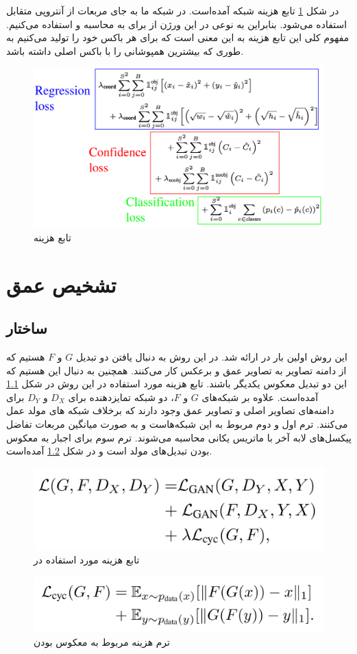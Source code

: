 \documentclass[12pt,a4paper]{report}
\begin{document}
در شکل \ref{yolo4} تابع هزینه شبکه  آمده‌است.
در شبکه ما به جای مربعات از آنتروپی متقابل استفاده می‌شود.
بنابراین به نوعی در این ورژن از  برای به محاسبه  و  استفاده می‌کنیم.
مفهوم کلی این تابع هزینه به این معنی است که برای هر  باکس خود را تولید می‌کنیم به طوری که بیشترین همپوشانی را با باکس اصلی داشته باشد.
\begin{figure}
  \centering
  \includegraphics[width=.8\textwidth]{Images//yolo4.png}
  \caption{تابع هزینه }\label{yolo4}
\end{figure}


\chapter{تشخیص عمق}

\section{ساختار }
این روش اولین بار در \cite{zhu2020unpaired} ارائه شد.
در این روش به دنبال یافتن دو تبدیل $G$ و $F$
هستیم که از دامنه تصاویر  به تصاویر عمق
و برعکس کار می‌کنند. همچنین به دنبال این هستیم که این دو تبدیل معکوس یکدیگر باشند.
تابع هزینه مورد استفاده در این روش در شکل \ref{cg_loss} آمده‌است.
علاوه بر شبکه‌های $G$ و $F$،
دو شبکه تمایزدهنده برای $D_X$ و $D_Y$
برای دامنه‌های تصاویر اصلی و تصاویر عمق وجود دارند که برخلاف شبکه های مولد عمل می‌کنند.
ترم اول و دوم مربوط به این شبکه‌هاست و به صورت میانگین مربعات تفاضل پیکسل‌های لابه
آخر با ماتریس یکانی محاسبه می‌شوند.
ترم سوم برای اجبار به معکوس بودن تبدیل‌های مولد است و در شکل \ref{cg_cycle} آمده‌است.
\begin{figure}[h]
  \centering
  \includegraphics[width=.5\textwidth]{Images//cg1.png}
  \caption{تابع هزینه مورد استفاده در }\label{cg_loss}
\end{figure}
\begin{figure}[h]
  \centering
  \includegraphics[width=.5\textwidth]{Images//cg2.png}
  \caption{ترم هزینه مربوط به معکوس بودن}\label{cg_cycle}
\end{figure}
\end{document}
